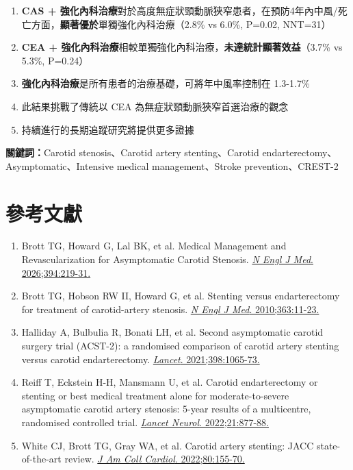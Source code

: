 \documentclass[12pt,a4paper]{article}
\begin{document}
\begin{enumerate}
    \item \textcolor{emergency_red}{\textbf{CAS + 強化內科治療}}對於高度無症狀頸動脈狹窄患者，在預防4年內中風/死亡方面，\textbf{顯著優於}單獨強化內科治療（2.8\% vs 6.0\%, P=0.02, NNT=31）

    \item \textcolor{emergency_red}{\textbf{CEA + 強化內科治療}}相較單獨強化內科治療，\textbf{未達統計顯著效益}（3.7\% vs 5.3\%, P=0.24）

    \item \textbf{強化內科治療}是所有患者的治療基礎，可將年中風率控制在 1.3-1.7\%

    \item 此結果挑戰了傳統以 CEA 為無症狀頸動脈狹窄首選治療的觀念

    \item 持續進行的長期追蹤研究將提供更多證據
\end{enumerate}

\vspace{0.5cm}
\textbf{關鍵詞：}Carotid stenosis、Carotid artery stenting、Carotid endarterectomy、Asymptomatic、Intensive medical management、Stroke prevention、CREST-2

\section{參考文獻}

\begin{enumerate}
    \item Brott TG, Howard G, Lal BK, et al. Medical Management and Revascularization for Asymptomatic Carotid Stenosis. \href{https://doi.org/10.1056/NEJMoa2508800}{\textit{N Engl J Med}. 2026;394:219-31.}

    \item Brott TG, Hobson RW II, Howard G, et al. Stenting versus endarterectomy for treatment of carotid-artery stenosis. \href{https://doi.org/10.1056/NEJMoa0912321}{\textit{N Engl J Med}. 2010;363:11-23.}

    \item Halliday A, Bulbulia R, Bonati LH, et al. Second asymptomatic carotid surgery trial (ACST-2): a randomised comparison of carotid artery stenting versus carotid endarterectomy. \href{https://doi.org/10.1016/S0140-6736(21)01910-3}{\textit{Lancet}. 2021;398:1065-73.}

    \item Reiff T, Eckstein H-H, Mansmann U, et al. Carotid endarterectomy or stenting or best medical treatment alone for moderate-to-severe asymptomatic carotid artery stenosis: 5-year results of a multicentre, randomised controlled trial. \href{https://doi.org/10.1016/S1474-4422(22)00290-3}{\textit{Lancet Neurol}. 2022;21:877-88.}

    \item White CJ, Brott TG, Gray WA, et al. Carotid artery stenting: JACC state-of-the-art review. \href{https://doi.org/10.1016/j.jacc.2022.05.007}{\textit{J Am Coll Cardiol}. 2022;80:155-70.}
\end{enumerate}
\end{document}

